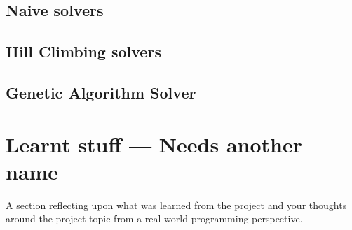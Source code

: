 \documentclass[a4paper]{article}
\begin{document}
\subsection{Naive solvers}
\subsection{Hill Climbing solvers}
\subsection{Genetic Algorithm Solver}

\section{Learnt stuff --- Needs another name}
A section reflecting upon what was learned from the project and your
thoughts around the project topic from a real-world programming perspective.
\end{document}
